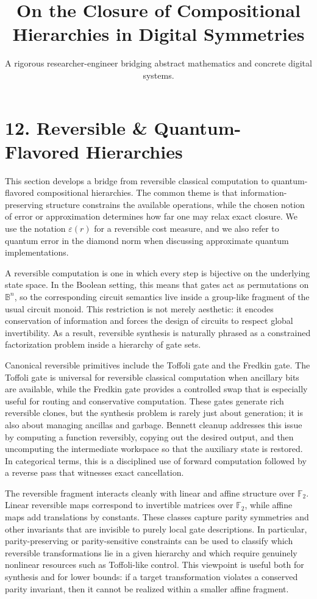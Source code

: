 \documentclass[11pt]{article}
\title{On the Closure of Compositional Hierarchies in Digital Symmetries}
\author{A rigorous researcher-engineer bridging abstract mathematics and concrete digital systems.}
\begin{document}
\section*{12. Reversible \& Quantum-Flavored Hierarchies}

This section develops a bridge from reversible classical computation to quantum-flavored compositional hierarchies. The common theme is that information-preserving structure constrains the available operations, while the chosen notion of error or approximation determines how far one may relax exact closure. We use the notation \(\varepsilon(r)\) for a reversible cost measure, and we also refer to quantum error in the diamond norm when discussing approximate quantum implementations.

A reversible computation is one in which every step is bijective on the underlying state space. In the Boolean setting, this means that gates act as permutations on \(\mathbb{B}^n\), so the corresponding circuit semantics live inside a group-like fragment of the usual circuit monoid. This restriction is not merely aesthetic: it encodes conservation of information and forces the design of circuits to respect global invertibility. As a result, reversible synthesis is naturally phrased as a constrained factorization problem inside a hierarchy of gate sets.

Canonical reversible primitives include the Toffoli gate and the Fredkin gate. The Toffoli gate is universal for reversible classical computation when ancillary bits are available, while the Fredkin gate provides a controlled swap that is especially useful for routing and conservative computation. These gates generate rich reversible clones, but the synthesis problem is rarely just about generation; it is also about managing ancillas and garbage. Bennett cleanup addresses this issue by computing a function reversibly, copying out the desired output, and then uncomputing the intermediate workspace so that the auxiliary state is restored. In categorical terms, this is a disciplined use of forward computation followed by a reverse pass that witnesses exact cancellation.

The reversible fragment interacts cleanly with linear and affine structure over \(\mathbb{F}_2\). Linear reversible maps correspond to invertible matrices over \(\mathbb{F}_2\), while affine maps add translations by constants. These classes capture parity symmetries and other invariants that are invisible to purely local gate descriptions. In particular, parity-preserving or parity-sensitive constraints can be used to classify which reversible transformations lie in a given hierarchy and which require genuinely nonlinear resources such as Toffoli-like control. This viewpoint is useful both for synthesis and for lower bounds: if a target transformation violates a conserved parity invariant, then it cannot be realized within a smaller affine fragment.
\end{document}

